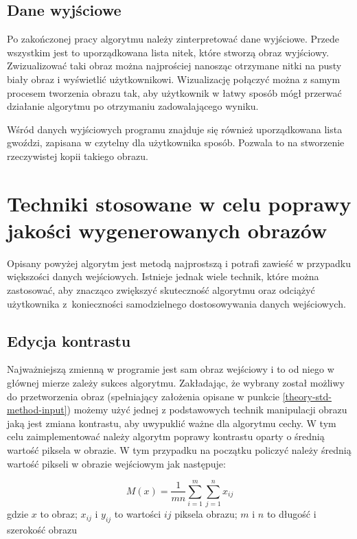         \subsection{Dane wyjściowe} \label{theory-std-method-output}
        Po zakończonej pracy algorytmu należy zinterpretować dane wyjściowe. Przede wszystkim jest to uporządkowana lista nitek, które stworzą obraz wyjściowy. Zwizualizować taki obraz można najprościej nanosząc otrzymane nitki na pusty biały obraz i wyświetlić użytkownikowi. Wizualizację połączyć można z samym procesem tworzenia obrazu tak, aby użytkownik w łatwy sposób mógł przerwać działanie algorytmu po otrzymaniu zadowalającego wyniku.
        
        Wśród danych wyjściowych programu znajduje się również uporządkowana lista gwoździ, zapisana w czytelny dla użytkownika sposób. Pozwala to na stworzenie rzeczywistej kopii takiego obrazu.
        
    \section{Techniki stosowane w celu poprawy jakości wygenerowanych obrazów} \label{theory-technics}
    Opisany powyżej algorytm jest metodą najprostszą i potrafi zawieść w przypadku większości danych wejściowych. Istnieje jednak wiele technik, które można zastosować, aby znacząco zwiększyć skuteczność algorytmu oraz odciążyć użytkownika z~konieczności samodzielnego dostosowywania danych wejściowych.
        \subsection{Edycja kontrastu} \label{theory-technics-contrast}
        Najważniejszą zmienną w programie jest sam obraz wejściowy i to od niego w głównej mierze zależy sukces algorytmu. Zakładając, że wybrany został możliwy do przetworzenia obraz (spełniający założenia opisane w punkcie \ref{theory-std-method-input}) możemy użyć jednej z podstawowych technik manipulacji obrazu jaką jest zmiana kontrastu, aby uwypuklić ważne dla algorytmu cechy. W tym celu zaimplementować należy algorytm poprawy kontrastu oparty o średnią wartość piksela w obrazie. W tym przypadku na początku policzyć należy średnią wartość pikseli w obrazie wejściowym jak następuje:
        
        \begin{equation} \label{theory-technics-contrast-mean}
            M(x) = \frac{1}{mn} \sum_{i=1}^m \sum_{j=1}^n x_{ij}
        \end{equation}
        gdzie \(x\) to obraz; \(x_{ij}\) i \(y_{ij}\) to wartości \(ij\) piksela obrazu; \(m\) i \(n\) to długość i szerokość obrazu
        
